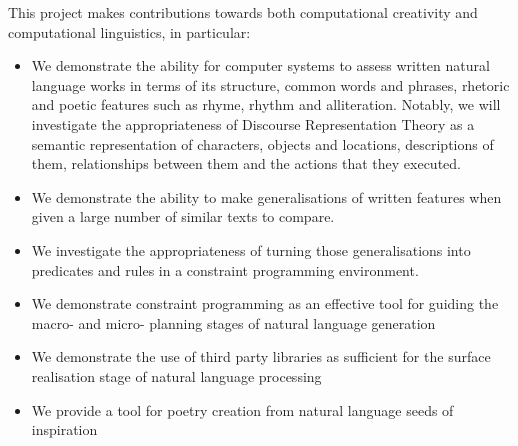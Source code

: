 This project makes contributions towards both computational creativity and computational linguistics, in particular:
\begin{itemize}
\item{We demonstrate the ability for computer systems to assess written natural language works in terms of its structure, common words and phrases, rhetoric and poetic features such as rhyme, rhythm and alliteration. Notably, we will investigate the appropriateness of Discourse Representation Theory as a semantic representation of characters, objects and locations, descriptions of them, relationships between them and the actions that they executed.}
\item {We demonstrate the ability to make generalisations of written features when given a large number of similar texts to compare.}
\item{We investigate the appropriateness of turning those generalisations into predicates and rules in a constraint programming  environment.}
\item{We demonstrate constraint programming as an effective tool for guiding the macro- and micro- planning stages of natural language generation}
\item{We demonstrate the use of third party libraries as sufficient for the surface realisation stage of natural language processing}
\item{We provide a tool for poetry creation from natural language seeds of inspiration}
\end{itemize}




